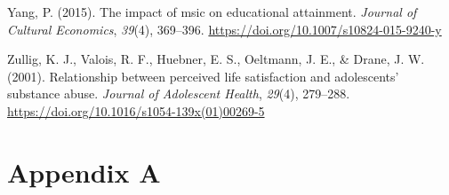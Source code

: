 \documentclass[a4, 12pt]{article}
\begin{document}
\leavevmode\hypertarget{ref-Yang2015}{}%
Yang, P. (2015). The impact of msic on educational attainment. \emph{Journal of Cultural Economics}, \emph{39}(4), 369--396. \url{https://doi.org/10.1007/s10824-015-9240-y}

\leavevmode\hypertarget{ref-Zullig2001}{}%
Zullig, K. J., Valois, R. F., Huebner, E. S., Oeltmann, J. E., \& Drane, J. W. (2001). Relationship between perceived life satisfaction and adolescents' substance abuse. \emph{Journal of Adolescent Health}, \emph{29}(4), 279--288. \url{https://doi.org/10.1016/s1054-139x(01)00269-5}

\clearpage

\hypertarget{appendix-appendix}{%
\appendix}


\hypertarget{appendix-a}{%
\section{Appendix A}\label{appendix-a}}
\end{document}
